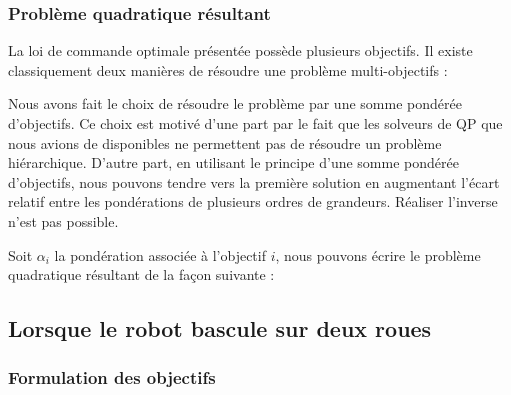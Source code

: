 					

			\subsubsection{Problème quadratique résultant}
				\label{section.qp_3roues}
				
				La loi de commande optimale présentée possède plusieurs objectifs. Il existe classiquement deux manières de résoudre une problème multi-objectifs :
				
				Nous avons fait le choix de résoudre le problème par une somme pondérée d'objectifs. 
				Ce choix est motivé d'une part par le fait que les solveurs de QP que nous avions de disponibles ne permettent pas de résoudre un problème hiérarchique.
				D'autre part, en utilisant le principe d'une somme pondérée d'objectifs, nous pouvons tendre vers la première solution en augmentant l'écart relatif entre les pondérations de plusieurs ordres de grandeurs.
				Réaliser l'inverse n'est pas possible.
				
				Soit $\alpha_i$ la pondération associée à l'objectif $i$, nous pouvons écrire le problème quadratique résultant de la façon suivante :
				
				

		\subsection{Lorsque le robot bascule sur deux roues}
			\label{section.mpc_deux_roues}
			\subsubsection{Formulation des objectifs}
			
